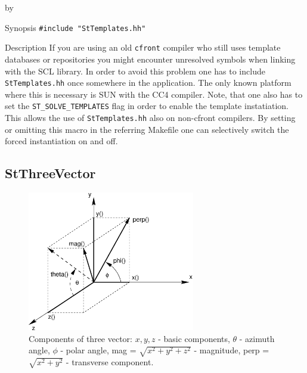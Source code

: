 \documentclass[twoside]{article}
\newcommand{\comp}[1]{\texttt{#1}}%
\newcommand{\entrylabel}[1]{\mbox{\textbf{{#1}}}\hfil}%
\newenvironment{entry}
{\begin{list}{}%
    {\renewcommand{\makelabel}{\entrylabel}%
     \setlength{\labelwidth}{90pt}%
     \setlength{\leftmargin}{\labelwidth}
     \advance\leftmargin by \labelsep%
      }%
    }%
  {\end{list}}
\newcommand{\Entrylabel}[1]%
{\raisebox{0pt}[1ex][0pt]{\makebox[\labelwidth][l]%
    {\parbox[t]{\labelwidth}{\hspace{0pt}\textbf{{#1}}}}}}
\newenvironment{Entry}%
{\renewcommand{\entrylabel}{\Entrylabel}\begin{entry}}%
  {\end{entry}}
\begin{document}
\begin{description}
\begin{Entry}
\item[Synopsis]
    \verb+#include "StTemplates.hh"+
    
  
\item[Description]   
    If you are using an old \texttt{cfront} compiler 
    who still uses template databases
    or repositories you might encounter unresolved symbols when linking with the SCL library.
    In order to avoid this problem one has to include \comp{StTemplates.hh}
    once somewhere in the application. The only known platform where this is necessary is
    SUN with the CC4 compiler. Note, that one also has to set the \comp{ST\_SOLVE\_TEMPLATES}
    flag in order to enable the template instatiation. This allows the use of \comp{StTemplates.hh}
    also on non-cfront compilers. By setting or omitting this macro in the referring Makefile
    one can selectively switch the forced instantiation on and off.

\end{Entry}
\clearpage

%
%
\subsection{StThreeVector } \label{StThreeVector}
\begin{figure}[bh]
    \begin{center}
        \includegraphics[width=0.65\textwidth]{vec3.eps}
        \caption{Components of three vector: $x,y,z$ - basic components,
            $\theta$ - azimuth angle, $\phi$ - polar angle, mag =
            $\sqrt{x^2+y^2+z^2}$ - magnitude, perp = $\sqrt{x^2+y^2}$
            - transverse component.}
        \label{fig:StThreeVector}
    \end{center}    
\end{figure}


\end{description}
\end{document}
